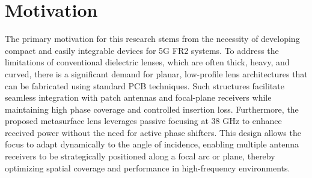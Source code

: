 



\section{Motivation}
The primary motivation for this research stems from the necessity of developing compact and easily integrable devices for 5G FR2 systems. To address the limitations of conventional dielectric lenses, which are often thick, heavy, and curved, there is a significant demand for planar, low-profile lens architectures that can be fabricated using standard PCB techniques. Such structures facilitate seamless integration with patch antennas and focal-plane receivers while maintaining high phase coverage and controlled insertion loss. Furthermore, the proposed metasurface lens leverages passive focusing at 38 GHz to enhance received power without the need for active phase shifters. This design allows the focus to adapt dynamically to the angle of incidence, enabling multiple antenna receivers to be strategically positioned along a focal arc or plane, thereby optimizing spatial coverage and performance in high-frequency environments.



